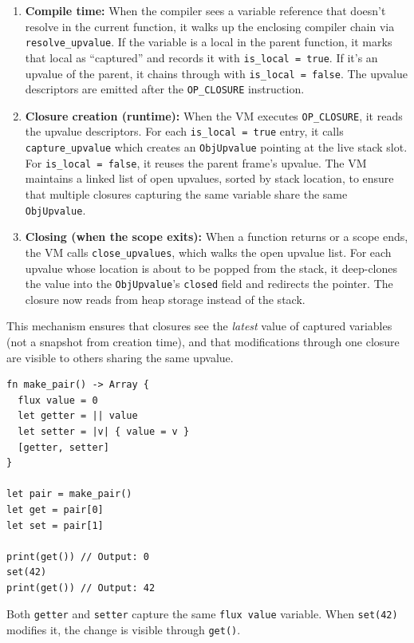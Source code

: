 \begin{enumerate}
  \item \textbf{Compile time:} When the compiler sees a variable reference that doesn't resolve in the current function, it walks up the enclosing compiler chain via \texttt{resolve\_upvalue}. If the variable is a local in the parent function, it marks that local as ``captured'' and records it with \lstinline|is_local = true|. If it's an upvalue of the parent, it chains through with \lstinline|is_local = false|. The upvalue descriptors are emitted after the \lstinline|OP_CLOSURE| instruction.

  \item \textbf{Closure creation (runtime):} When the VM executes \lstinline|OP_CLOSURE|, it reads the upvalue descriptors. For each \lstinline|is_local = true| entry, it calls \texttt{capture\_upvalue} which creates an \lstinline|ObjUpvalue| pointing at the live stack slot. For \lstinline|is_local = false|, it reuses the parent frame's upvalue. The VM maintains a linked list of open upvalues, sorted by stack location, to ensure that multiple closures capturing the same variable share the same \lstinline|ObjUpvalue|.

  \item \textbf{Closing (when the scope exits):} When a function returns or a scope ends, the VM calls \texttt{close\_upvalues}, which walks the open upvalue list. For each upvalue whose location is about to be popped from the stack, it deep-clones the value into the \lstinline|ObjUpvalue|'s \lstinline|closed| field and redirects the pointer. The closure now reads from heap storage instead of the stack.
\end{enumerate}

This mechanism ensures that closures see the \emph{latest} value of captured variables (not a snapshot from creation time), and that modifications through one closure are visible to others sharing the same upvalue.

\begin{lstlisting}[language=Lattice, caption={Multiple closures sharing an upvalue}]
fn make_pair() -> Array {
  flux value = 0
  let getter = || value
  let setter = |v| { value = v }
  [getter, setter]
}

let pair = make_pair()
let get = pair[0]
let set = pair[1]

print(get()) // Output: 0
set(42)
print(get()) // Output: 42
\end{lstlisting}

Both \lstinline|getter| and \lstinline|setter| capture the same \lstinline|flux value| variable. When \lstinline|set(42)| modifies it, the change is visible through \lstinline|get()|.

